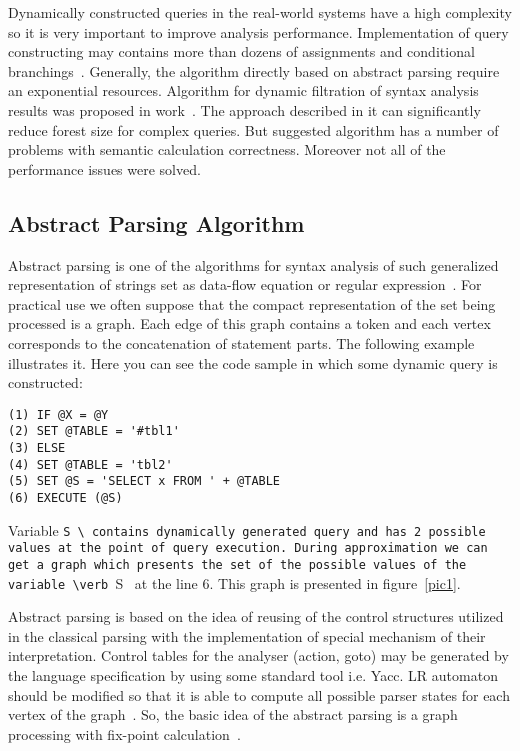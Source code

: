 \documentclass{acm_proc_article-sp}
\begin{document}
Dynamically constructed queries in the real-world systems have a high complexity so it is very important to improve analysis performance. Implementation of query constructing may contains more than dozens of assignments and conditional branchings~\cite{GrigorevDSQL}. Generally, the algorithm directly based on abstract parsing require an exponential resources. Algorithm for dynamic filtration of syntax analysis results was proposed in work~\cite{GrigorevDSQL}. The approach described in it can significantly reduce forest size for complex queries. But suggested algorithm has a number of problems with semantic calculation correctness. Moreover not all of the performance issues were solved.

\subsection{Abstract Parsing Algorithm}

Abstract parsing is one of the algorithms for syntax analysis of such generalized representation of strings set as data-flow equation or regular expression~\cite{Doh:2009:APS:1615441.1615461}. For practical use we often suppose that the compact representation of the set being processed is a graph. Each edge of this graph contains a token and each vertex corresponds to the concatenation of statement parts. The following example illustrates it. Here you can see the code sample in which some dynamic query is constructed:

\begin{verbatim} 
(1) IF @X = @Y
(2) SET @TABLE = '#tbl1'
(3) ELSE
(4) SET @TABLE = 'tbl2'
(5) SET @S = 'SELECT x FROM ' + @TABLE
(6) EXECUTE (@S)
\end{verbatim}

Variable \verb @S \ contains dynamically generated query and has 2 possible values at the point of query execution. During approximation we can get a graph which presents the set of the possible values of the variable \verb @S \ at the line 6. This graph is presented in figure~\ref{pic1}.


\begin{figure*}
    \centering
    \caption{Graph for dynamic query.}
    \label{pic1}
\end{figure*}


Abstract parsing is based on the idea of reusing of the control structures utilized in the classical parsing with the implementation of special mechanism of their interpretation. Control tables for the analyser (action, goto) may be generated by the language specification by using some standard tool i.e. Yacc. LR automaton~\cite{Grune:2010:PTP:1951778} should be modified so that it is able to compute all possible parser states for each vertex of the graph~\cite{Doh:2009:APS:1615441.1615461}. So, the basic idea of the abstract parsing is a graph processing with fix-point calculation~\cite{AlvorConf}.
\end{document}

